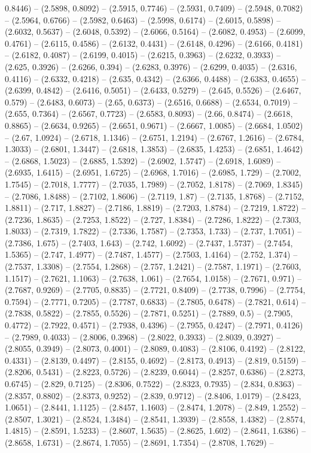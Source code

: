 0.8446) -- (2.5898, 0.8092) -- (2.5915, 0.7746) -- (2.5931, 0.7409) -- (2.5948, 0.7082) -- (2.5964, 0.6766) -- (2.5982, 0.6463) -- (2.5998, 0.6174) -- (2.6015, 0.5898) -- (2.6032, 0.5637) -- (2.6048, 0.5392) -- (2.6066, 0.5164) -- (2.6082, 0.4953) -- (2.6099, 0.4761) -- (2.6115, 0.4586) -- (2.6132, 0.4431) -- (2.6148, 0.4296) -- (2.6166, 0.4181) -- (2.6182, 0.4087) -- (2.6199, 0.4015) -- (2.6215, 0.3963) -- (2.6232, 0.3933) -- (2.625, 0.3926) -- (2.6266, 0.394) -- (2.6283, 0.3976) -- (2.6299, 0.4035) -- (2.6316, 0.4116) -- (2.6332, 0.4218) -- (2.635, 0.4342) -- (2.6366, 0.4488) -- (2.6383, 0.4655) -- (2.6399, 0.4842) -- (2.6416, 0.5051) -- (2.6433, 0.5279) -- (2.645, 0.5526) -- (2.6467, 0.579) -- (2.6483, 0.6073) -- (2.65, 0.6373) -- (2.6516, 0.6688) -- (2.6534, 0.7019) -- (2.655, 0.7364) -- (2.6567, 0.7723) -- (2.6583, 0.8093) -- (2.66, 0.8474) -- (2.6618, 0.8865) -- (2.6634, 0.9265) -- (2.6651, 0.9671) -- (2.6667, 1.0085) -- (2.6684, 1.0502) -- (2.67, 1.0924) -- (2.6718, 1.1346) -- (2.6751, 1.2194) -- (2.6767, 1.2616) -- (2.6784, 1.3033) -- (2.6801, 1.3447) -- (2.6818, 1.3853) -- (2.6835, 1.4253) -- (2.6851, 1.4642) -- (2.6868, 1.5023) -- (2.6885, 1.5392) -- (2.6902, 1.5747) -- (2.6918, 1.6089) -- (2.6935, 1.6415) -- (2.6951, 1.6725) -- (2.6968, 1.7016) -- (2.6985, 1.729) -- (2.7002, 1.7545) -- (2.7018, 1.7777) -- (2.7035, 1.7989) -- (2.7052, 1.8178) -- (2.7069, 1.8345) -- (2.7086, 1.8488) -- (2.7102, 1.8606) -- (2.7119, 1.87) -- (2.7135, 1.8768) -- (2.7152, 1.8811) -- (2.717, 1.8827) -- (2.7186, 1.8819) -- (2.7203, 1.8784) -- (2.7219, 1.8722) -- (2.7236, 1.8635) -- (2.7253, 1.8522) -- (2.727, 1.8384) -- (2.7286, 1.8222) -- (2.7303, 1.8033) -- (2.7319, 1.7822) -- (2.7336, 1.7587) -- (2.7353, 1.733) -- (2.737, 1.7051) -- (2.7386, 1.675) -- (2.7403, 1.643) -- (2.742, 1.6092) -- (2.7437, 1.5737) -- (2.7454, 1.5365) -- (2.747, 1.4977) -- (2.7487, 1.4577) -- (2.7503, 1.4164) -- (2.752, 1.374) -- (2.7537, 1.3308) -- (2.7554, 1.2868) -- (2.757, 1.2421) -- (2.7587, 1.1971) -- (2.7603, 1.1517) -- (2.7621, 1.1063) -- (2.7638, 1.061) -- (2.7654, 1.0158) -- (2.7671, 0.971) -- (2.7687, 0.9269) -- (2.7705, 0.8835) -- (2.7721, 0.8409) -- (2.7738, 0.7996) -- (2.7754, 0.7594) -- (2.7771, 0.7205) -- (2.7787, 0.6833) -- (2.7805, 0.6478) -- (2.7821, 0.614) -- (2.7838, 0.5822) -- (2.7855, 0.5526) -- (2.7871, 0.5251) -- (2.7889, 0.5) -- (2.7905, 0.4772) -- (2.7922, 0.4571) -- (2.7938, 0.4396) -- (2.7955, 0.4247) -- (2.7971, 0.4126) -- (2.7989, 0.4033) -- (2.8006, 0.3968) -- (2.8022, 0.3933) -- (2.8039, 0.3927) -- (2.8055, 0.3949) -- (2.8073, 0.4001) -- (2.8089, 0.4083) -- (2.8106, 0.4192) -- (2.8122, 0.4331) -- (2.8139, 0.4497) -- (2.8155, 0.4692) -- (2.8173, 0.4913) -- (2.819, 0.5159) -- (2.8206, 0.5431) -- (2.8223, 0.5726) -- (2.8239, 0.6044) -- (2.8257, 0.6386) -- (2.8273, 0.6745) -- (2.829, 0.7125) -- (2.8306, 0.7522) -- (2.8323, 0.7935) -- (2.834, 0.8363) -- (2.8357, 0.8802) -- (2.8373, 0.9252) -- (2.839, 0.9712) -- (2.8406, 1.0179) -- (2.8423, 1.0651) -- (2.8441, 1.1125) -- (2.8457, 1.1603) -- (2.8474, 1.2078) -- (2.849, 1.2552) -- (2.8507, 1.3021) -- (2.8524, 1.3484) -- (2.8541, 1.3939) -- (2.8558, 1.4382) -- (2.8574, 1.4815) -- (2.8591, 1.5233) -- (2.8607, 1.5635) -- (2.8625, 1.602) -- (2.8641, 1.6386) -- (2.8658, 1.6731) -- (2.8674, 1.7055) -- (2.8691, 1.7354) -- (2.8708, 1.7629) -- 